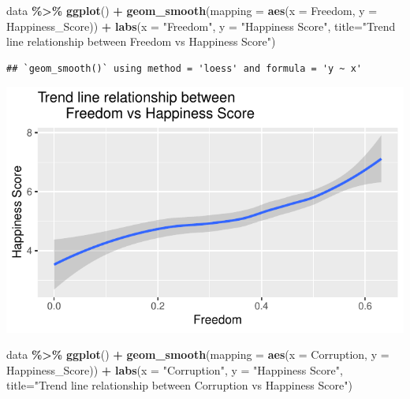 \documentclass[
  11pt,
]{article}
\newenvironment{Shaded}{\begin{snugshade}}{\end{snugshade}}
\newcommand{\AttributeTok}[1]{\textcolor[rgb]{0.13,0.29,0.53}{#1}}
\newcommand{\FunctionTok}[1]{\textcolor[rgb]{0.13,0.29,0.53}{\textbf{#1}}}
\newcommand{\NormalTok}[1]{#1}
\newcommand{\SpecialCharTok}[1]{\textcolor[rgb]{0.81,0.36,0.00}{\textbf{#1}}}
\newcommand{\StringTok}[1]{\textcolor[rgb]{0.31,0.60,0.02}{#1}}
\begin{document}
\begin{Shaded}
\begin{Highlighting}[]
\NormalTok{data }\SpecialCharTok{\%\textgreater{}\%}
  \FunctionTok{ggplot}\NormalTok{() }\SpecialCharTok{+}
  \FunctionTok{geom\_smooth}\NormalTok{(}\AttributeTok{mapping =} \FunctionTok{aes}\NormalTok{(}\AttributeTok{x =}\NormalTok{ Freedom, }\AttributeTok{y =}\NormalTok{ Happiness\_Score)) }\SpecialCharTok{+}
  \FunctionTok{labs}\NormalTok{(}\AttributeTok{x =} \StringTok{"Freedom"}\NormalTok{, }\AttributeTok{y =} \StringTok{"Happiness Score"}\NormalTok{, }
       \AttributeTok{title=}\StringTok{"Trend line relationship between }
\StringTok{       Freedom vs Happiness Score"}\NormalTok{)}
\end{Highlighting}
\end{Shaded}

\begin{verbatim}
## `geom_smooth()` using method = 'loess' and formula = 'y ~ x'
\end{verbatim}

\begin{center}\includegraphics[width=0.7\linewidth]{Group_project_2_files/figure-latex/unnamed-chunk-12-1} \end{center}

\begin{Shaded}
\begin{Highlighting}[]
\NormalTok{data }\SpecialCharTok{\%\textgreater{}\%}
  \FunctionTok{ggplot}\NormalTok{() }\SpecialCharTok{+}
  \FunctionTok{geom\_smooth}\NormalTok{(}\AttributeTok{mapping =} \FunctionTok{aes}\NormalTok{(}\AttributeTok{x =}\NormalTok{ Corruption, }\AttributeTok{y =}\NormalTok{ Happiness\_Score)) }\SpecialCharTok{+}
  \FunctionTok{labs}\NormalTok{(}\AttributeTok{x =} \StringTok{"Corruption"}\NormalTok{, }\AttributeTok{y =} \StringTok{"Happiness Score"}\NormalTok{, }
       \AttributeTok{title=}\StringTok{"Trend line relationship between }
\StringTok{       Corruption vs Happiness Score"}\NormalTok{)}
\end{Highlighting}
\end{Shaded}
\end{document}
